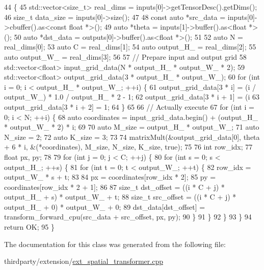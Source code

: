 \begin{DoxyCode}
44                                                              \{
45         std::vector<size\_t> real\_dims = inputs[0]->getTensorDesc().getDims();
46         \textcolor{keywordtype}{size\_t} data\_size = inputs[0]->size();
47 
48         \textcolor{keyword}{const} \textcolor{keyword}{auto} *src\_data = inputs[0]->cbuffer().as<\textcolor{keyword}{const} \textcolor{keywordtype}{float} *>();
49         \textcolor{keyword}{auto} *theta = inputs[1]->buffer().as<\textcolor{keywordtype}{float} *>();
50         \textcolor{keyword}{auto} *dst\_data = outputs[0]->buffer().as<\textcolor{keywordtype}{float} *>();
51 
52         \textcolor{keyword}{auto} N = real\_dims[0];
53         \textcolor{keyword}{auto} C = real\_dims[1];
54         \textcolor{keyword}{auto} output\_H\_ = real\_dims[2];
55         \textcolor{keyword}{auto} output\_W\_ = real\_dims[3];
56 
57         \textcolor{comment}{// Prepare input and output grid}
58         std::vector<float> input\_grid\_data(N * output\_H\_ * output\_W\_ * 2);
59         std::vector<float> output\_grid\_data(3 * output\_H\_ * output\_W\_);
60         \textcolor{keywordflow}{for} (\textcolor{keywordtype}{int} i = 0; i < output\_H\_ * output\_W\_; ++i) \{
61             output\_grid\_data[3 * i] = (i / output\_W\_) * 1.0 / output\_H\_ * 2 - 1;
62             output\_grid\_data[3 * i + 1] = (i %
63             output\_grid\_data[3 * i + 2] = 1;
64         \}
65 
66         \textcolor{comment}{// Actually execute}
67         \textcolor{keywordflow}{for} (\textcolor{keywordtype}{int} i = 0; i < N; ++i) \{
68             \textcolor{keyword}{auto} coordinates = input\_grid\_data.begin() + (output\_H\_ * output\_W\_ * 2) * i;
69 
70             \textcolor{keyword}{auto} M\_size = output\_H\_ * output\_W\_;
71             \textcolor{keyword}{auto} N\_size = 2;
72             \textcolor{keyword}{auto} K\_size = 3;
73 
74             matrixMult(&output\_grid\_data[0], theta + 6 * i, &(*coordinates), M\_size, N\_size, K\_size, \textcolor{keyword}{true});
75 
76             \textcolor{keywordtype}{int} row\_idx;
77             \textcolor{keywordtype}{float} px, py;
78 
79             \textcolor{keywordflow}{for} (\textcolor{keywordtype}{int} j = 0; j < C; ++j) \{
80                 \textcolor{keywordflow}{for} (\textcolor{keywordtype}{int} s = 0; s < output\_H\_; ++s) \{
81                     \textcolor{keywordflow}{for} (\textcolor{keywordtype}{int} t = 0; t < output\_W\_; ++t) \{
82                         row\_idx = output\_W\_ * s + t;
83 
84                         px = coordinates[row\_idx * 2];
85                         py = coordinates[row\_idx * 2 + 1];
86 
87                         \textcolor{keywordtype}{size\_t} dst\_offset = ((i * C + j) * output\_H\_ + s) * output\_W\_ + t;
88                         \textcolor{keywordtype}{size\_t} src\_offset = ((i * C + j) * output\_H\_ + 0) * output\_W\_ + 0;
89                         dst\_data[dst\_offset] = transform\_forward\_cpu(src\_data + src\_offset, px, py);
90                     \}
91                 \}
92             \}
93         \}
94         \textcolor{keywordflow}{return} OK;
95     \}
\end{DoxyCode}


The documentation for this class was generated from the following file\+:\begin{DoxyCompactItemize}
\item 
thirdparty/extension/\hyperlink{ext__spatial__transformer_8cpp}{ext\+\_\+spatial\+\_\+transformer.\+cpp}\end{DoxyCompactItemize}

